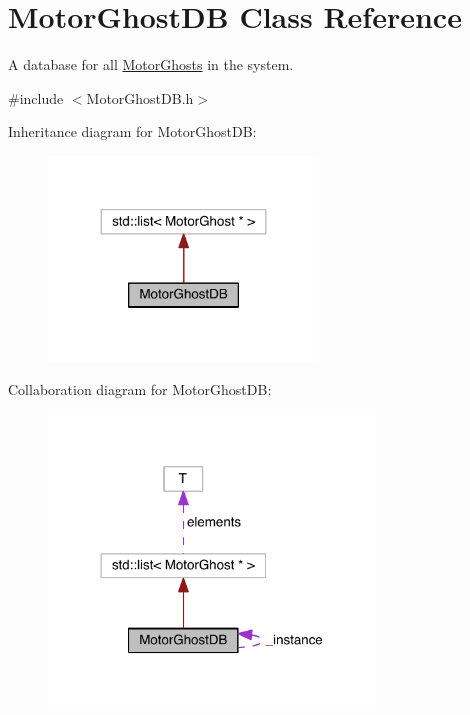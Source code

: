 \hypertarget{classMotorGhostDB}{\section{Motor\+Ghost\+D\+B Class Reference}
\label{classMotorGhostDB}
}


A database for all \hyperlink{classMotorGhost}{Motor\+Ghosts} in the system.  




{\ttfamily \#include $<$Motor\+Ghost\+D\+B.\+h$>$}



Inheritance diagram for Motor\+Ghost\+D\+B\+:\nopagebreak
\begin{figure}[H]
\begin{center}
\leavevmode
\includegraphics[width=203pt]{classMotorGhostDB__inherit__graph}
\end{center}
\end{figure}


Collaboration diagram for Motor\+Ghost\+D\+B\+:\nopagebreak
\begin{figure}[H]
\begin{center}
\leavevmode
\includegraphics[width=246pt]{classMotorGhostDB__coll__graph}
\end{center}
\end{figure}
